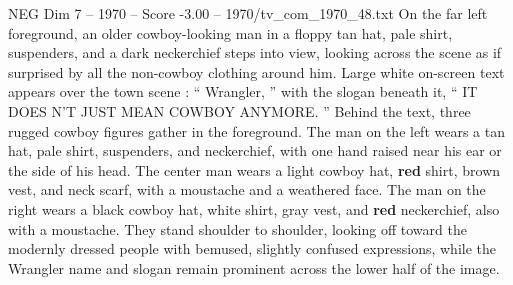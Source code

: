 \begin{textsample}{NEG Dim 7 – 1970 – Score -3.00 – 1970/tv\_com\_1970\_48.txt}
On the far left foreground, an older cowboy-looking man in a floppy tan hat, pale shirt, suspenders, and a dark neckerchief steps into view, looking across the scene as if surprised by all the non-cowboy clothing around him.
Large white on-screen text appears over the town scene : “ Wrangler, ” with the slogan beneath it, “ IT DOES N’T JUST MEAN COWBOY ANYMORE. ” Behind the text, three rugged cowboy figures gather in the foreground.
The man on the left wears a tan hat, pale shirt, suspenders, and neckerchief, with one hand raised near his ear or the side of his head.
The center man wears a light cowboy hat, \textbf{red} shirt, brown vest, and neck scarf, with a moustache and a weathered face.
The man on the right wears a black cowboy hat, white shirt, gray vest, and \textbf{red} neckerchief, also with a moustache.
They stand shoulder to shoulder, looking off toward the modernly dressed people with bemused, slightly confused expressions, while the Wrangler name and slogan remain prominent across the lower half of the image.

\end{textsample}
